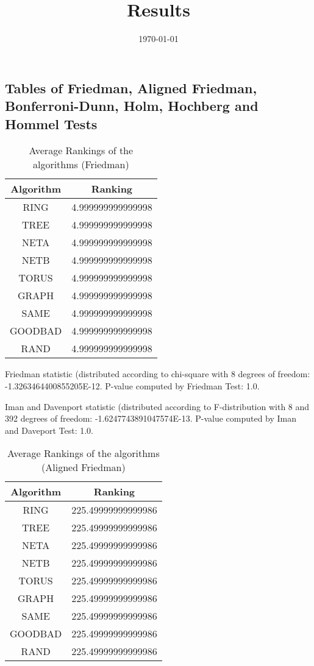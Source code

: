 \documentclass[a4paper,10pt]{article}
\title{Results}
\author{}
\date{\today}
\begin{document}
\begin{landscape}
\oddsidemargin 0in \topmargin 0in\maketitle
\section{Tables of Friedman, Aligned Friedman, Bonferroni-Dunn, Holm, Hochberg and Hommel Tests}
\begin{table}[!htp]
\centering
\caption{Average Rankings of the algorithms (Friedman)
}\begin{tabular}{c|c}
Algorithm&Ranking\\
\hline
 RING&4.999999999999998\\
 TREE&4.999999999999998\\
 NETA&4.999999999999998\\
 NETB&4.999999999999998\\
 TORUS&4.999999999999998\\
 GRAPH&4.999999999999998\\
 SAME&4.999999999999998\\
 GOODBAD&4.999999999999998\\
 RAND&4.999999999999998\\
\end{tabular}
\end{table}


Friedman statistic (distributed according to chi-square with 8 degrees of freedom: -1.3263464400855205E-12. 
P-value computed by Friedman Test: 1.0.\newline

Iman and Davenport statistic (distributed according to F-distribution with 8 and 392 degrees of freedom: -1.6247743891047574E-13. 
P-value computed by Iman and Daveport Test: 1.0.\newline


\newpage

\begin{table}[!htp]
\centering
\caption{Average Rankings of the algorithms (Aligned Friedman)
}\begin{tabular}{c|c}
Algorithm&Ranking\\
\hline
 RING&225.49999999999986\\
 TREE&225.49999999999986\\
 NETA&225.49999999999986\\
 NETB&225.49999999999986\\
 TORUS&225.49999999999986\\
 GRAPH&225.49999999999986\\
 SAME&225.49999999999986\\
 GOODBAD&225.49999999999986\\
 RAND&225.49999999999986\\
\end{tabular}
\end{table}



\end{landscape}
\end{document}
